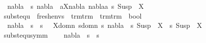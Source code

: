 \begin{isabellebody}
\ \ {\isachardoublequoteopen}nabla{}\ {\isasymTurnstile}\ s\ nabla{}\ {\isasymequiv}\ {\isacharparenleft}{\kern0pt}{\isasymforall}{\isacharparenleft}{\kern0pt}a{\isacharcomma}{\kern0pt}X{\isacharparenright}{\kern0pt}{\isasymin}nabla{}{\isachardot}{\kern0pt}\ nabla{}{\isasymturnstile}a{\isasymsharp}\ s\ {\isacharparenleft}{\kern0pt}Susp\ {\isacharbrackleft}{\kern0pt}{\isacharbrackright}{\kern0pt}\ X{\isacharparenright}{\kern0pt}{\isacharparenright}{\kern0pt}{\isachardoublequoteclose}\isanewline
\isanewline
\isanewline
\isanewline
{}\isamarkupfalse%
\ subst{\isacharunderscore}{\kern0pt}equ\ {\isacharcolon}{\kern0pt}{\isacharcolon}{\kern0pt}\ {\isachardoublequoteopen}fresh{\isacharunderscore}{\kern0pt}envs\ {\isasymRightarrow}\ {\isacharparenleft}{\kern0pt}trm{\isasymRightarrow}trm{\isacharparenright}{\kern0pt}\ {\isasymRightarrow}\ {\isacharparenleft}{\kern0pt}trm{\isasymRightarrow}trm{\isacharparenright}{\kern0pt}\ {\isasymRightarrow}\ bool{\isachardoublequoteclose}\ {\isacharparenleft}{\kern0pt}{\isachardoublequoteopen}\ {\isacharunderscore}{\kern0pt}\ {\isasymTurnstile}\ {\isacharunderscore}{\kern0pt}\ {\isasymapprox}\ {\isacharunderscore}{\kern0pt}{\isachardoublequoteclose}\ {\isacharbrackleft}{\kern0pt}{}{}{\isacharcomma}{\kern0pt}{}{}{\isacharcomma}{\kern0pt}{}{}{\isacharbrackright}{\kern0pt}\ {}{}{\isacharparenright}{\kern0pt}\isanewline
\ \ \isanewline
\ \ {\isachardoublequoteopen}nabla\ {\isasymTurnstile}\ s{}\ {\isasymapprox}\ s{}\ {\isasymequiv}\ \ {\isasymforall}X{\isasymin}{\isacharparenleft}{\kern0pt}domn\ s{}{\isasymunion}domn\ s{}{\isacharparenright}{\kern0pt}{\isachardot}{\kern0pt}\ {\isacharparenleft}{\kern0pt}nabla\ {\isasymturnstile}\ s{}\ {\isacharparenleft}{\kern0pt}Susp\ {\isacharbrackleft}{\kern0pt}{\isacharbrackright}{\kern0pt}\ X{\isacharparenright}{\kern0pt}\ {\isasymapprox}\ s{}\ {\isacharparenleft}{\kern0pt}Susp\ {\isacharbrackleft}{\kern0pt}{\isacharbrackright}{\kern0pt}\ X{\isacharparenright}{\kern0pt}{\isacharparenright}{\kern0pt}{\isachardoublequoteclose}\isanewline
\isanewline
{}\isamarkupfalse%
\ subst{\isacharunderscore}{\kern0pt}equ{\isacharunderscore}{\kern0pt}symm{\isacharcolon}{\kern0pt}\ \isanewline
\ \ \ {\isachardoublequoteopen}nabla\ {\isasymTurnstile}\ s{}\ {\isasymapprox}\ s{}{\isachardoublequoteclose}\isanewline

\end{isabellebody}
